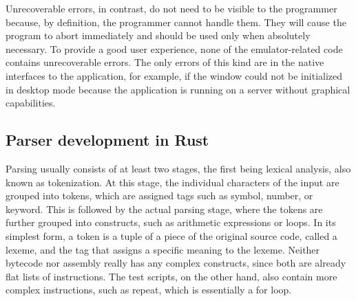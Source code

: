 Unrecoverable errors, in contrast, do not need to be visible to the programmer because, by definition, the programmer cannot handle them.
They will cause the program to abort immediately and should be used only when absolutely necessary.
To provide a good user experience, none of the emulator-related code contains unrecoverable errors.
The only errors of this kind are in the native interfaces to the application, for example, if the window could not be initialized in desktop mode because the application is running on a server without graphical capabilities.

\subsection{Parser development in Rust} \label{parser-dev}
Parsing usually consists of at least two stages, the first being lexical analysis, also known as tokenization.
At this stage, the individual characters of the input are grouped into tokens, which are assigned tags such as symbol, number, or keyword.
This is followed by the actual parsing stage, where the tokens are further grouped into constructs, such as arithmetic expressions or loops.
In its simplest form, a token is a tuple of a piece of the original source code, called a lexeme, and the tag that assigns a specific meaning to the lexeme.
Neither bytecode nor assembly really has any complex constructs, since both are already flat lists of instructions.
The test scripts, on the other hand, also contain more complex instructions, such as repeat, which is essentially a for loop.

